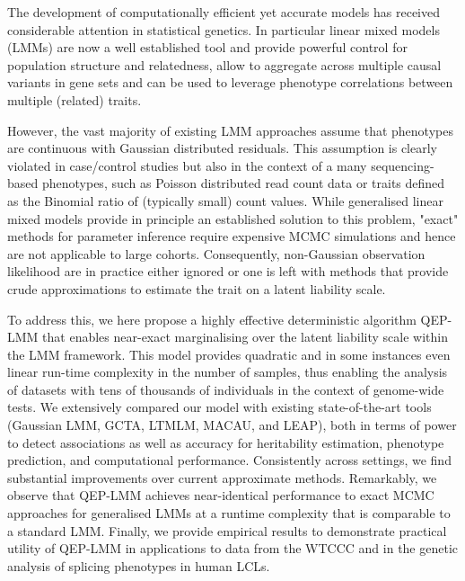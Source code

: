 \documentclass{article}
\begin{document}
The development of computationally efficient yet accurate models has received considerable attention in statistical genetics. In particular linear mixed models (LMMs) are now a well established tool and provide powerful control for population structure and relatedness, allow to aggregate across multiple causal variants in gene sets and can be used to leverage phenotype correlations between multiple (related) traits.

However, the vast majority of existing LMM approaches assume that phenotypes are continuous with Gaussian distributed residuals. This assumption is clearly violated in case/control studies but also in the context of a many sequencing-based phenotypes, such as Poisson distributed read count data or traits defined as the Binomial ratio of (typically small) count values. While generalised linear mixed models provide in principle an established solution to this problem, "exact" methods for parameter inference require expensive MCMC simulations and hence are not applicable to large cohorts. Consequently, non-Gaussian observation likelihood are in practice either ignored or one is left with methods that provide crude approximations to estimate the trait on a latent liability scale.

To address this, we here propose a highly effective deterministic algorithm QEP-LMM that enables near-exact marginalising over the latent liability scale within the LMM framework. This model provides quadratic and in some instances even linear run-time complexity in the number of samples, thus enabling the analysis of datasets with tens of thousands of individuals in the context of genome-wide tests. We extensively compared our model with existing state-of-the-art tools (Gaussian LMM, GCTA, LTMLM, MACAU, and LEAP), both in terms of power to detect associations as well as accuracy for heritability estimation, phenotype prediction, and computational performance. Consistently across settings, we find substantial improvements over current approximate methods. Remarkably, we observe that QEP-LMM achieves near-identical performance to exact MCMC approaches for generalised LMMs at a runtime complexity that is comparable to a standard LMM. Finally, we provide empirical results to demonstrate practical utility of QEP-LMM in applications to data from the WTCCC and in the genetic analysis of splicing phenotypes in human LCLs.
\end{document}
